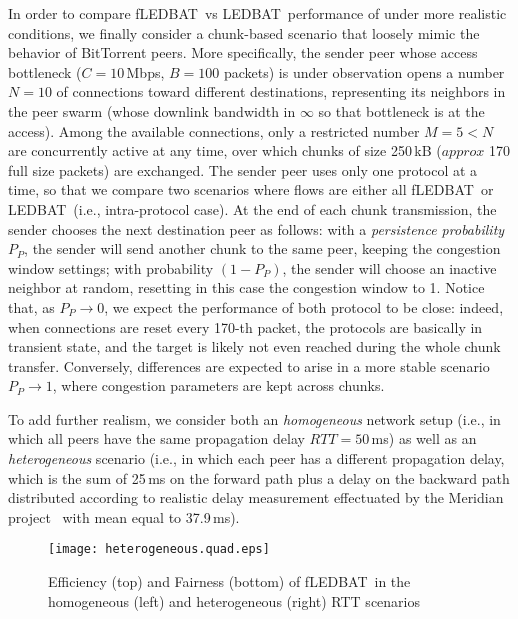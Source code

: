 \documentclass[conference]{IEEEtran}
\newcommand{\figLC}[2]{
        \caption{#2}
        \label{fig:#1}
        \vspace{-5pt}
}
\newcommand{\btledbat}[0]{LEDBAT}
\newcommand{\fledbat}[0]{fLEDBAT}
\begin{document}
In order to compare \fledbat\ vs \btledbat\ performance of under more realistic conditions, we
finally consider a chunk-based scenario that loosely mimic the behavior of BitTorrent peers.
More specifically, the sender peer whose access bottleneck ($C=10$\,Mbps, $B=100$ packets)
is under observation opens a number $N=10$ of connections toward different destinations,
representing its neighbors in the peer swarm (whose downlink bandwidth in $\infty$ so that
bottleneck is at the access). Among the available connections, only a restricted number $M=5<N$
are concurrently active at any time, over which chunks of size  250\,kB ($approx$ 170 full size packets) are exchanged. The
sender peer uses only one protocol at a time, so that we compare two scenarios where flows
are either all \fledbat\ or \btledbat\ (i.e., intra-protocol case).
At the end of each chunk transmission, the sender chooses the next destination peer as follows:
with a \emph{persistence probability} $P_P$, the sender will send another chunk to the same
peer, keeping the congestion window settings; with probability $(1-P_P)$, the sender will
choose an inactive neighbor at random, resetting in this case the congestion window to 1.
Notice that, as $P_P\rightarrow 0$, we expect the performance of both protocol to be close:
indeed, when connections are reset every 170-th packet, the protocols are basically in transient
state, and the target is likely not even reached during the whole chunk transfer. Conversely,
differences are expected to arise in a more stable scenario $P_P\rightarrow 1$, where congestion
parameters are kept across chunks.

To add further realism, we consider both an \emph{homogeneous} network setup (i.e., in which
all peers have the same propagation delay $RTT=50$\,ms) as well as an \emph{heterogeneous} scenario
(i.e., in which each peer has a different propagation delay, which is the sum of 25\,ms on the 
forward path plus a delay on the backward path distributed according to realistic delay measurement 
effectuated by the Meridian project~\cite{meridian} with mean equal to 37.9\,ms).

\begin{figure}[t]
    \begin{center}
        \texttt{[image: heterogeneous.quad.eps]}
        \figLC{realisticRTT}{Efficiency (top) and Fairness (bottom) of \fledbat\ in the homogeneous (left) and heterogeneous (right) RTT scenarios}
    \end{center}
\vspace{-4mm}
\end{figure}
\end{document}
